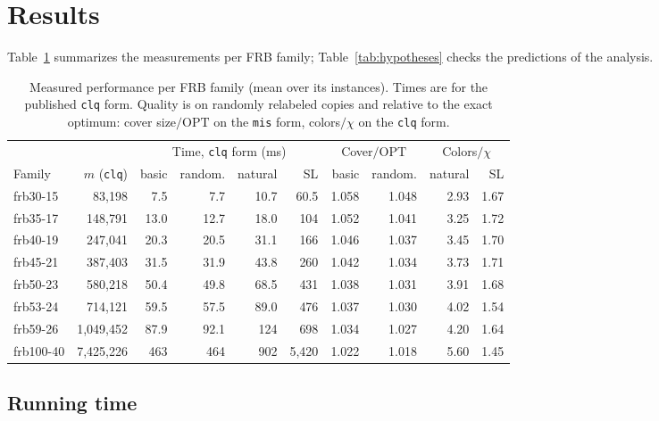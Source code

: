 \documentclass[acmsmall,nonacm]{acmart}
\newcommand{\code}[1]{\texttt{#1}}
\newcommand{\OPT}{\mathrm{OPT}}
\begin{document}
\section{Results}
\label{sec:results}

Table~\ref{tab:results} summarizes the measurements per FRB family;
Table~\ref{tab:hypotheses} checks the predictions of the analysis.

\begin{table}[t]
\caption{Measured performance per FRB family (mean over its instances). Times are for the published \code{clq} form. Quality is on randomly relabeled copies and relative to the exact optimum: cover size$/\OPT$ on the \code{mis} form, colors$/\chi$ on the \code{clq} form.}
\label{tab:results}
\footnotesize
\setlength{\tabcolsep}{4pt}
\begin{tabular}{@{}lr|rrrr|rr|rr@{}}
\toprule
 & & \multicolumn{4}{c|}{Time, \code{clq} form (ms)} & \multicolumn{2}{c|}{Cover$/\OPT$} & \multicolumn{2}{c}{Colors$/\chi$} \\
Family & $m$ (\code{clq}) & basic & random. & natural & SL & basic & random. & natural & SL \\
\midrule
frb30-15 & 83,198 & 7.5 & 7.7 & 10.7 & 60.5 & 1.058 & 1.048 & 2.93 & 1.67 \\
frb35-17 & 148,791 & 13.0 & 12.7 & 18.0 & 104 & 1.052 & 1.041 & 3.25 & 1.72 \\
frb40-19 & 247,041 & 20.3 & 20.5 & 31.1 & 166 & 1.046 & 1.037 & 3.45 & 1.70 \\
frb45-21 & 387,403 & 31.5 & 31.9 & 43.8 & 260 & 1.042 & 1.034 & 3.73 & 1.71 \\
frb50-23 & 580,218 & 50.4 & 49.8 & 68.5 & 431 & 1.038 & 1.031 & 3.91 & 1.68 \\
frb53-24 & 714,121 & 59.5 & 57.5 & 89.0 & 476 & 1.037 & 1.030 & 4.02 & 1.54 \\
frb59-26 & 1,049,452 & 87.9 & 92.1 & 124 & 698 & 1.034 & 1.027 & 4.20 & 1.64 \\
frb100-40 & 7,425,226 & 463 & 464 & 902 & 5,420 & 1.022 & 1.018 & 5.60 & 1.45 \\
\bottomrule
\end{tabular}
\end{table}

\subsection{Running time}
\end{document}
